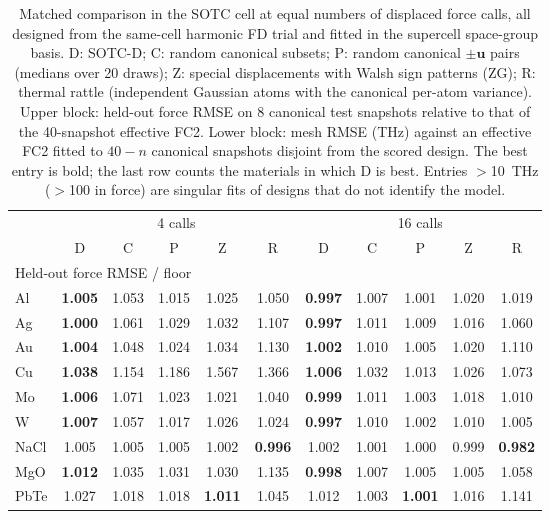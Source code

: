 \begin{table}[t]
\caption{Matched comparison in the SOTC cell at equal numbers of displaced force calls, all designed from the same-cell harmonic FD trial and fitted in the supercell space-group basis. D: SOTC-D; C: random canonical subsets; P: random canonical $\pm\mathbf u$ pairs (medians over 20 draws); Z: special displacements with Walsh sign patterns (ZG); R: thermal rattle (independent Gaussian atoms with the canonical per-atom variance). Upper block: held-out force RMSE on 8 canonical test snapshots relative to that of the 40-snapshot effective FC2. Lower block: mesh RMSE (THz) against an effective FC2 fitted to $40-n$ canonical snapshots disjoint from the scored design. The best entry is bold; the last row counts the materials in which D is best. Entries $>$10~THz ($>$100 in force) are singular fits of designs that do not identify the model.}
\label{tab:matched_4_16}
\begin{ruledtabular}
\begin{tabular}{lcccccccccc}
 & \multicolumn{5}{c}{4 calls} & \multicolumn{5}{c}{16 calls}\\
 & D & C & P & Z & R & D & C & P & Z & R\\
\hline
\multicolumn{11}{l}{Held-out force RMSE / floor}\\
Al & \textbf{1.005} & 1.053 & 1.015 & 1.025 & 1.050 & \textbf{0.997} & 1.007 & 1.001 & 1.020 & 1.019\\
Ag & \textbf{1.000} & 1.061 & 1.029 & 1.032 & 1.107 & \textbf{0.997} & 1.011 & 1.009 & 1.016 & 1.060\\
Au & \textbf{1.004} & 1.048 & 1.024 & 1.034 & 1.130 & \textbf{1.002} & 1.010 & 1.005 & 1.020 & 1.110\\
Cu & \textbf{1.038} & 1.154 & 1.186 & 1.567 & 1.366 & \textbf{1.006} & 1.032 & 1.013 & 1.026 & 1.073\\
Mo & \textbf{1.006} & 1.071 & 1.023 & 1.021 & 1.040 & \textbf{0.999} & 1.011 & 1.003 & 1.018 & 1.010\\
W & \textbf{1.007} & 1.057 & 1.017 & 1.026 & 1.024 & \textbf{0.997} & 1.010 & 1.002 & 1.010 & 1.005\\
NaCl & 1.005 & 1.005 & 1.005 & 1.002 & \textbf{0.996} & 1.002 & 1.001 & 1.000 & 0.999 & \textbf{0.982}\\
MgO & \textbf{1.012} & 1.035 & 1.031 & 1.030 & 1.135 & \textbf{0.998} & 1.007 & 1.005 & 1.005 & 1.058\\
PbTe & 1.027 & 1.018 & 1.018 & \textbf{1.011} & 1.045 & 1.012 & 1.003 & \textbf{1.001} & 1.016 & 1.141\\

\end{tabular}
\end{ruledtabular}
\end{table}
